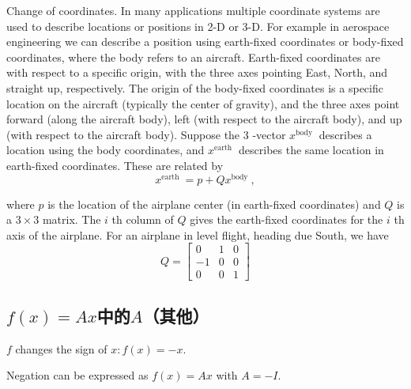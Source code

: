 \begin{example}
    Change of coordinates. In many applications multiple coordinate systems are used to describe locations or positions in 2-D or 3-D. For example in aerospace engineering we can describe a position using earth-fixed coordinates or body-fixed coordinates, where the body refers to an aircraft. Earth-fixed coordinates are with respect to a specific origin, with the three axes pointing East, North, and straight up, respectively. The origin of the body-fixed coordinates is a specific location on the aircraft (typically the center of gravity), and the three axes point forward (along the aircraft body), left (with respect to the aircraft body), and up (with respect to the aircraft body). Suppose the 3 -vector $ x^{\text {body }} $ describes a location using the body coordinates, and $ x^{\text {earth }} $ describes the same location in earth-fixed coordinates. These are related by
$$
x^{\text {earth }}=p+Q x^{\text {body }},
$$

where $ p $ is the location of the airplane center (in earth-fixed coordinates) and $ Q $ is a $ 3 \times 3 $ matrix. The $ i $ th column of $ Q $ gives the earth-fixed coordinates for the $ i $ th
axis of the airplane. For an airplane in level flight, heading due South, we have
$$
Q=\left[\begin{array}{rrr}
0 & 1 & 0 \\
-1 & 0 & 0 \\
0 & 0 & 1
\end{array}\right]
$$
\end{example}


\subsection{$f(x)=A x$中的$A$（其他）}

\begin{example}[Negation]
    $ f $ changes the sign of $ x: f(x)=-x $.

Negation can be expressed as $ f(x)=A x $ with $ A=-I $.
\end{example}

